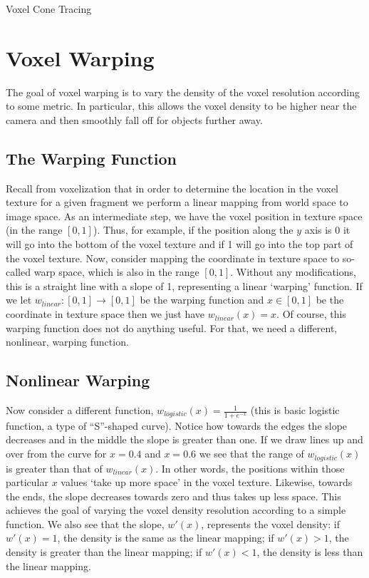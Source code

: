 \begin{algorithm}
    \caption{Voxel Cone Tracing}
    \label{alg:voxelconetracing}
    \begin{algorithmic}
        \EndProcedure
    \end{algorithmic}
\end{algorithm}

\section{Voxel Warping}
The goal of voxel warping is to vary the density of the voxel resolution according to some metric. In particular, this allows the voxel density to be higher near the camera and then smoothly fall off for objects further away.

\subsection{The Warping Function}
Recall from voxelization that in order to determine the location in the voxel texture for a given fragment we perform a linear mapping from world space to image space. As an intermediate step, we have the voxel position in texture space (in the range $[0, 1]$). Thus, for example, if the position along the $y$ axis is 0 it will go into the bottom of the voxel texture and if 1 will go into the top part of the voxel texture. Now, consider mapping the coordinate in texture space to so-called warp space, which is also in the range $[0, 1]$. Without any modifications, this is a straight line with a slope of 1, representing a linear `warping' function. If we let $w_{linear}: [0, 1] \rightarrow [0, 1]$ be the warping function and $x \in [0, 1]$ be the coordinate in texture space then we just have $w_{linear}(x) = x$. Of course, this warping function does not do anything useful. For that, we need a different, nonlinear, warping function.

\subsection{Nonlinear Warping}
Now consider a different function, $w_{logistic}(x) = \frac{1}{1 + e^{-x}}$ (this is basic logistic function, a type of ``S''-shaped curve). Notice how towards the edges the slope decreases and in the middle the slope is greater than one. If we draw lines up and over from the curve for $x = 0.4$ and $x = 0.6$ we see that the range of $w_{logistic}(x)$ is greater than that of $w_{linear}(x)$. In other words, the positions within those particular $x$ values `take up more space' in the voxel texture. Likewise, towards the ends, the slope decreases towards zero and thus takes up less space. This achieves the goal of varying the voxel density resolution according to a simple function. We also see that the slope, $w'(x)$, represents the voxel density: if $w'(x) = 1$, the density is the same as the linear mapping; if $w'(x) > 1$, the density is greater than the linear mapping; if $w'(x) < 1$, the density is less than the linear mapping.

